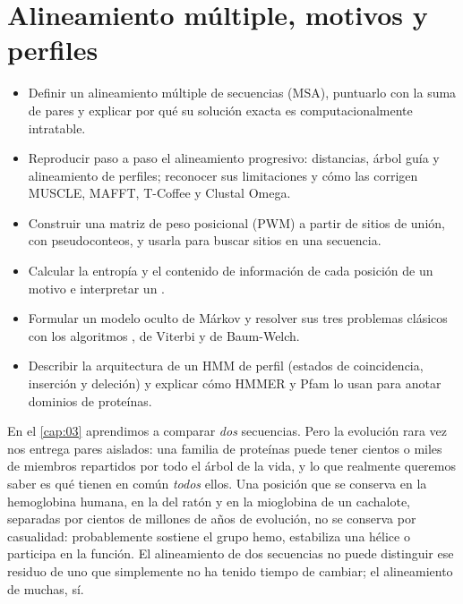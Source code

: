 \chapter{Alineamiento múltiple, motivos y perfiles}\label{cap:04}


\begin{objetivos}
\begin{itemize}
  \item Definir un alineamiento múltiple de secuencias (MSA), puntuarlo con la suma de pares y explicar por qué su solución exacta es computacionalmente intratable.
  \item Reproducir paso a paso el alineamiento progresivo: distancias, árbol guía y alineamiento de perfiles; reconocer sus limitaciones y cómo las corrigen MUSCLE, MAFFT, T-Coffee y Clustal Omega.
  \item Construir una matriz de peso posicional (PWM) a partir de sitios de unión, con pseudoconteos, y usarla para buscar sitios en una secuencia.
  \item Calcular la entropía y el contenido de información de cada posición de un motivo e interpretar un .
  \item Formular un modelo oculto de Márkov y resolver sus tres problemas clásicos con los algoritmos , de Viterbi y de Baum-Welch.
  \item Describir la arquitectura de un HMM de perfil (estados de coincidencia, inserción y deleción) y explicar cómo HMMER y Pfam lo usan para anotar dominios de proteínas.
\end{itemize}
\end{objetivos}

En el \cref{cap:03} aprendimos a comparar \emph{dos} secuencias. Pero la evolución rara vez nos entrega pares aislados: una familia de proteínas puede tener cientos o miles de miembros repartidos por todo el árbol de la vida, y lo que realmente queremos saber es qué tienen en común \emph{todos} ellos. Una posición que se conserva en la hemoglobina humana, en la del ratón y en la mioglobina de un cachalote, separadas por cientos de millones de años de evolución, no se conserva por casualidad: probablemente sostiene el grupo hemo, estabiliza una hélice o participa en la función. El alineamiento de dos secuencias no puede distinguir ese residuo de uno que simplemente no ha tenido tiempo de cambiar; el alineamiento de muchas, sí.

